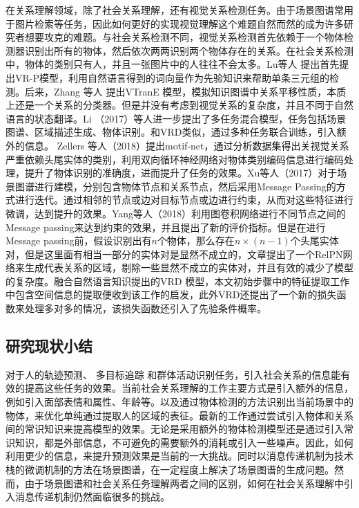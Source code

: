 在关系理解领域，除了社会关系理解，还有视觉关系检测任务。由于场景图谱常用于图片检索\cite{johnson2015image}等任务，因此如何更好的实现视觉理解这个难题自然而然的成为许多研究者想要攻克的难题。与社会关系检测不同，视觉关系检测首先依赖于一个物体检测器识别出所有的物体，然后依次两两识别两个物体存在的关系。在社会关系检测中，物体的类别只有人，并且一张图片中的人往往不会太多。Lu等人\cite{lu2016visual} 提出首先提出VR-P模型，利用自然语言得到的词向量作为先验知识来帮助单条三元组的检测。后来，Zhang 等人\cite{zhang2017visual} 提出VTranE 模型，模拟知识图谱中关系平移性质，本质上还是一个关系的分类器。但是并没有考虑到视觉关系的复杂度，并且不同于自然语言的状态翻译。Li （2017）等人\cite{li2017scene}进一步提出了多任务混合模型，任务包括场景图谱、区域描述生成、物体识别。和VRD类似，通过多种任务联合训练，引入额外的信息。
Zellers 等人（2018）\cite{zellers2018neural}提出motif-net，通过分析数据集得出关视觉关系严重依赖头尾实体的类别，利用双向循环神经网络对物体类别编码信息进行编码处理，提升了物体识别的准确度，进而提升了任务的效果。Xu等人（2017）对于场景图谱进行建模，分别包含物体节点和关系节点，然后采用Message Passing的方式进行迭代。通过相邻的节点或边对目标节点或边进行约束，从而对这些特征进行微调，达到提升的效果。Yang等人（2018）利用图卷积网络进行不同节点之间的Message passing来达到约束的效果，并且提出了新的评价指标。但是在进行Message passing前，假设识别出有$n$个物体，那么存在$n \times (n-1)$个头尾实体对，但是这里面有相当一部分的实体对是显然不成立的，文章提出了一个RelPN网络来生成代表关系的区域，剔除一些显然不成立的实体对，并且有效的减少了模型的复杂度。融合自然语言知识提出的VRD 模型\cite{liang2018visual}，本文初始步骤中的特征提取工作中包含空间信息的提取便收到该工作的启发，此外VRD还提出了一个新的损失函数来处理多对多的情况，该损失函数还引入了先验条件概率。

\subsection{研究现状小结}
对于人的轨迹预测、 多目标追踪 和群体活动识别任务，引入社会关系的信息能有效的提高这些任务的效果。当前社会关系理解的工作主要方式是引入额外的信息，例如引入面部表情和属性、年龄等。以及通过物体检测的方法识别出当前场景中的物体，来优化单纯通过提取人的区域的表征。最新的工作通过尝试引入物体和关系间的常识知识来提高模型的效果。无论是采用额外的物体检测模型还是通过引入常识知识，都是外部信息，不可避免的需要额外的消耗或引入一些噪声。因此，如何利用更少的信息，来提升预测效果是当前的一大挑战。同时以消息传递机制为技术栈的微调机制的方法在场景图谱，在一定程度上解决了场景图谱的生成问题。然而，由于场景图谱和社会关系任务理解两者之间的区别，如何在社会关系理解中引入消息传递机制仍然面临很多的挑战。

